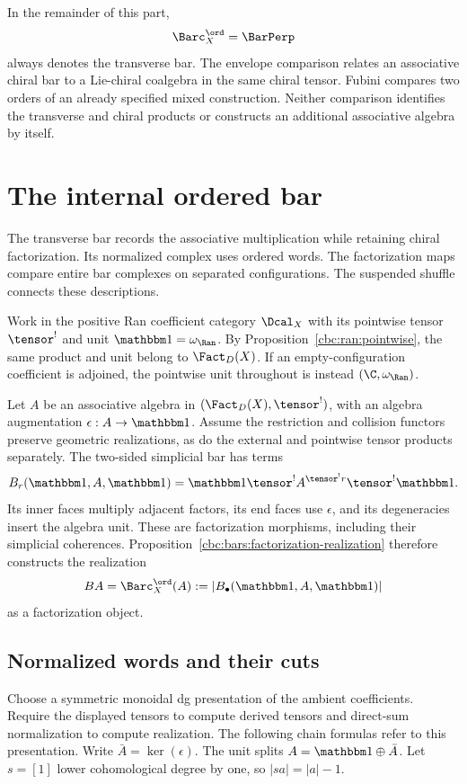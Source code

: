 In the remainder of this part,
\[
 \Barc_X^{\ord}=\BarPerp
\]
always denotes the transverse bar. The envelope comparison relates an associative chiral bar to a Lie-chiral coalgebra in the same chiral tensor. Fubini compares two orders of an already specified mixed construction. Neither comparison identifies the transverse and chiral products or constructs an additional associative algebra by itself.

\chapter{The internal ordered bar}
The transverse bar records the associative multiplication while retaining chiral factorization. Its normalized complex uses ordered words. The factorization maps compare entire bar complexes on separated configurations. The suspended shuffle connects these descriptions.

Work in the positive Ran coefficient category $\Dcal_X$ with its pointwise tensor $\tensor^!$ and unit $\mathbbm1=\omega_{\Ran}$. By Proposition~\ref{cbc:ran:pointwise}, the same product and unit belong to $\Fact_D(X)$. If an empty-configuration coefficient is adjoined, the pointwise unit throughout is instead $(\C,\omega_{\Ran})$.

Let $A$ be an associative algebra in $(\Fact_D(X),\tensor^!)$, with an algebra augmentation $\epsilon:A\to\mathbbm1$. Assume the restriction and collision functors preserve geometric realizations, as do the external and pointwise tensor products separately. The two-sided simplicial bar has terms
\[
 B_r(\mathbbm1,A,\mathbbm1)
 =\mathbbm1\tensor^!A^{\tensor^!r}\tensor^!\mathbbm1.
\]
Its inner faces multiply adjacent factors, its end faces use $\epsilon$, and its degeneracies insert the algebra unit. These are factorization morphisms, including their simplicial coherences. Proposition~\ref{cbc:bars:factorization-realization} therefore constructs the realization
\[
 BA=\Barc_X^{\ord}(A)
   :=\left|B_\bullet(\mathbbm1,A,\mathbbm1)\right|
\]
as a factorization object.

\section{Normalized words and their cuts}
Choose a symmetric monoidal dg presentation of the ambient coefficients. Require the displayed tensors to compute derived tensors and direct-sum normalization to compute realization. The following chain formulas refer to this presentation. Write $\bar A=\ker(\epsilon)$. The unit splits $A=\mathbbm1\oplus\bar A$. Let $s=[1]$ lower cohomological degree by one, so $|sa|=|a|-1$.

